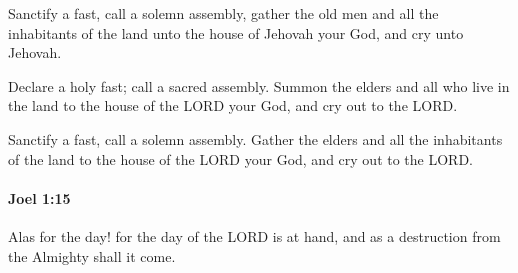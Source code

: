 			\begin{versebox}
					\item[BHS] 
					\item[LXX] 
					\item[ASV] Sanctify a fast, call a solemn assembly, gather the old men and all the inhabitants of the land unto the house of Jehovah your God, and cry unto Jehovah.
					\item[NIV] Declare a holy fast; call a sacred assembly. Summon the elders and all who live in the land to the house of the LORD your God, and cry out to the LORD.
					\item[NRSV] Sanctify a fast, call a solemn assembly. Gather the elders and all the inhabitants of the land to the house of the LORD your God, and cry out to the LORD.
			\end{versebox}

		\paragraph{Joel 1:15} %
			\label{JOEL-1-15}

			Alas for the day! for the day of the LORD is at hand, and as a destruction from the Almighty shall it come.

